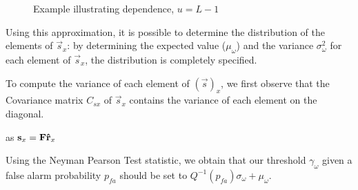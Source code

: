 \documentclass[a4paper, openany, oneside]{memoir}
\begin{document}
\begin{figure}
\caption{Example illustrating dependence, $u=L-1$}
\label{fig:ex_dep}
\end{figure}


Using this approximation, it is possible to determine the distribution of the elements  of $\vec{s}_x$: by determining the expected value ($\mu_{\omega}$) and the variance $\sigma_{\omega}^2$ for each element of $\vec{s}_x$, the distribution is completely specified.

To compute the variance of each element of $(\vec{s})_x$, we first observe that the Covariance matrix $C_{sx}$ of $\vec{s}_x$ contains the variance of each element  on the diagonal.

as $\boldsymbol{\mathbf{s}}_x = \boldsymbol{\mathbf{F}}\boldsymbol{\mathbf{\hat{r}}}_x$ 

Using the Neyman Pearson Test statistic, we obtain that our threshold $\gamma_{\omega}$ given a false alarm probability $p_{fa}$ should be set to $Q^{-1}(p_{fa})\sigma_{\omega} + \mu_{\omega}$.
\end{document}
